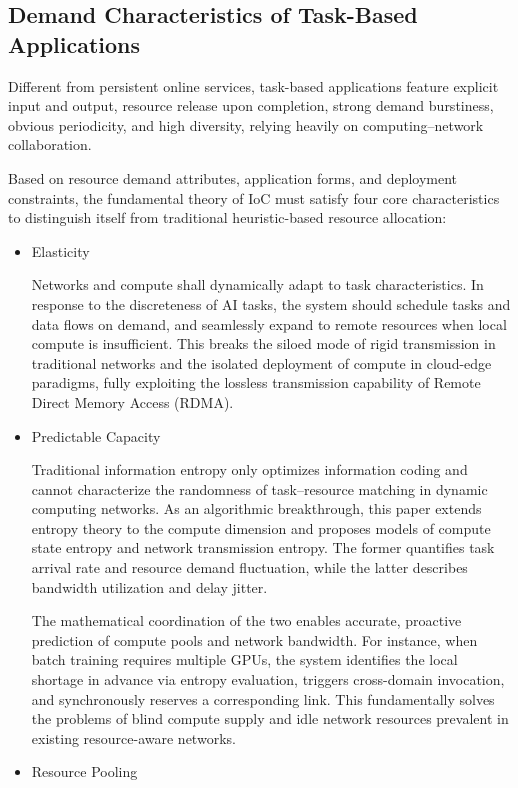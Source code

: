 \documentclass{ccjnl}
\begin{document}
\subsection{Demand Characteristics of Task-Based Applications}
\label{s3-2}
Different from persistent online services, task-based applications feature explicit input and output, resource release upon completion, strong demand burstiness, obvious periodicity, and high diversity, relying heavily on computing–network collaboration.

Based on resource demand attributes, application forms, and deployment constraints, the fundamental theory of IoC must satisfy four core characteristics to distinguish itself from traditional heuristic-based resource allocation:
\begin{itemize}[nosep]
	\item Elasticity
	
	Networks and compute shall dynamically adapt to task characteristics. In response to the discreteness of AI tasks, the system should schedule tasks and data flows on demand, and seamlessly expand to remote resources when local compute is insufficient. This breaks the siloed mode of rigid transmission in traditional networks and the isolated deployment of compute in cloud-edge paradigms, fully exploiting the lossless transmission capability of Remote Direct Memory Access (RDMA).
	\item Predictable Capacity
	
	Traditional information entropy only optimizes information coding and cannot characterize the randomness of task–resource matching in dynamic computing networks. As an algorithmic breakthrough, this paper extends entropy theory to the compute dimension and proposes models of compute state entropy and network transmission entropy. The former quantifies task arrival rate and resource demand fluctuation, while the latter describes bandwidth utilization and delay jitter.
	
	The mathematical coordination of the two enables accurate, proactive prediction of compute pools and network bandwidth. For instance, when batch training requires multiple GPUs, the system identifies the local shortage in advance via entropy evaluation, triggers cross-domain invocation, and synchronously reserves a corresponding link. This fundamentally solves the problems of blind compute supply and idle network resources prevalent in existing resource-aware networks.
	
	\item Resource Pooling
	

\end{itemize}
\end{document}
